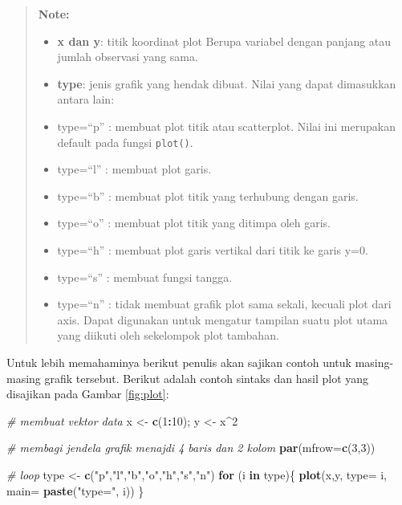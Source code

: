 \documentclass[]{book}
\newenvironment{Shaded}{\begin{snugshade}}{\end{snugshade}}
\newcommand{\KeywordTok}[1]{\textcolor[rgb]{0.13,0.29,0.53}{\textbf{#1}}}
\newcommand{\DataTypeTok}[1]{\textcolor[rgb]{0.13,0.29,0.53}{#1}}
\newcommand{\DecValTok}[1]{\textcolor[rgb]{0.00,0.00,0.81}{#1}}
\newcommand{\StringTok}[1]{\textcolor[rgb]{0.31,0.60,0.02}{#1}}
\newcommand{\CommentTok}[1]{\textcolor[rgb]{0.56,0.35,0.01}{\textit{#1}}}
\newcommand{\ControlFlowTok}[1]{\textcolor[rgb]{0.13,0.29,0.53}{\textbf{#1}}}
\newcommand{\OperatorTok}[1]{\textcolor[rgb]{0.81,0.36,0.00}{\textbf{#1}}}
\newcommand{\NormalTok}[1]{#1}
\providecommand{\tightlist}{%
  \setlength{\itemsep}{0pt}\setlength{\parskip}{0pt}}
\begin{document}
\begin{quote}
\textbf{Note: }

\begin{itemize}
\tightlist
\item
  \textbf{x dan y}: titik koordinat plot Berupa variabel dengan panjang
  atau jumlah observasi yang sama.
\item
  \textbf{type}: jenis grafik yang hendak dibuat. Nilai yang dapat
  dimasukkan antara lain:
\item
  type=``p'' : membuat plot titik atau scatterplot. Nilai ini merupakan
  default pada fungsi \texttt{plot()}.
\item
  type=``l'' : membuat plot garis.
\item
  type=``b'' : membuat plot titik yang terhubung dengan garis.
\item
  type=``o'' : membuat plot titik yang ditimpa oleh garis.
\item
  type=``h'' : membuat plot garis vertikal dari titik ke garis y=0.
\item
  type=``s'' : membuat fungsi tangga.
\item
  type=``n'' : tidak membuat grafik plot sama sekali, kecuali plot dari
  axis. Dapat digunakan untuk mengatur tampilan suatu plot utama yang
  diikuti oleh sekelompok plot tambahan.
\end{itemize}
\end{quote}

Untuk lebih memahaminya berikut penulis akan sajikan contoh untuk
masing-masing grafik tersebut. Berikut adalah contoh sintaks dan hasil
plot yang disajikan pada Gambar \ref{fig:plot}:

\begin{Shaded}
\begin{Highlighting}[]
\CommentTok{# membuat vektor data }
\NormalTok{x <-}\StringTok{ }\KeywordTok{c}\NormalTok{(}\DecValTok{1}\OperatorTok{:}\DecValTok{10}\NormalTok{); y <-}\StringTok{ }\NormalTok{x}\OperatorTok{^}\DecValTok{2}
\end{Highlighting}
\end{Shaded}

\begin{Shaded}
\begin{Highlighting}[]
\CommentTok{# membagi jendela grafik menajdi 4 baris dan 2 kolom}
\KeywordTok{par}\NormalTok{(}\DataTypeTok{mfrow=}\KeywordTok{c}\NormalTok{(}\DecValTok{3}\NormalTok{,}\DecValTok{3}\NormalTok{))}

\CommentTok{# loop}
\NormalTok{type <-}\StringTok{ }\KeywordTok{c}\NormalTok{(}\StringTok{"p"}\NormalTok{,}\StringTok{"l"}\NormalTok{,}\StringTok{"b"}\NormalTok{,}\StringTok{"o"}\NormalTok{,}\StringTok{"h"}\NormalTok{,}\StringTok{"s"}\NormalTok{,}\StringTok{"n"}\NormalTok{)}
\ControlFlowTok{for}\NormalTok{ (i }\ControlFlowTok{in}\NormalTok{ type)\{}
  \KeywordTok{plot}\NormalTok{(x,y, }\DataTypeTok{type=}\NormalTok{ i,}
       \DataTypeTok{main=} \KeywordTok{paste}\NormalTok{(}\StringTok{"type="}\NormalTok{, i))}
\NormalTok{\}}
\end{Highlighting}
\end{Shaded}
\end{document}
